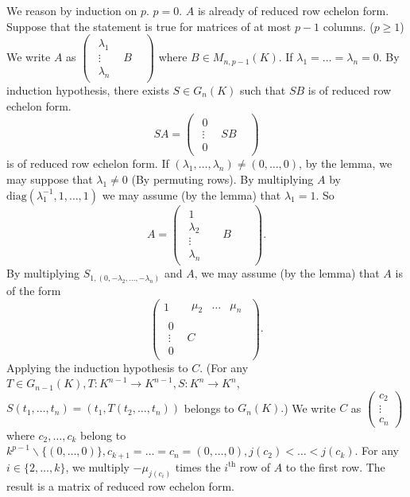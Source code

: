 \begin{proofenv}
    We reason by induction on $p$.
    \newline
    $p=0$. $A$ is already of reduced row echelon form.
    \newline
    Suppose that the statement is true for matrices of at most $p-1$ columns. ($p\ge 1$) We write $A$ as $\begin{pmatrix}
 \begin{matrix}
 \lambda _1\\
 \vdots\\
\lambda _n
\end{matrix} &B&
\end{pmatrix}$ where $B\in M_{n,p-1}(K)$. If $\lambda_1=\dots=\lambda_n=0$. By induction hypothesis, there exists $S\in G_n(K)$ such that $SB$ is of reduced row echelon form.
$$SA= \begin{pmatrix}\begin{matrix}
0\\
 \vdots\\
0
\end{matrix} &SB&
\end{pmatrix}$$
 is of reduced row echelon form. If $(\lambda_1,\dots,\lambda_n)\not=(0,\dots,0)$, by the lemma, we may suppose that $\lambda_1\not=0$ (By permuting rows). By multiplying $A$ by $\mathrm{diag}(\lambda_1^{-1},1,\dots,1)$ we may assume (by the lemma) that $\lambda_1=1$. So 
 $$A= \begin{pmatrix}\begin{matrix}
 1\\
\lambda _2\\
 \vdots\\
\lambda _n
\end{matrix} &&B&&
\end{pmatrix}.$$
By multiplying $S_{1,(0,-\lambda_2,\dots,-\lambda_n)}$ and $A$, we may assume (by the lemma) that $A$ is of the form 
$$\begin{pmatrix}
 1 &\begin{matrix}
  \mu_2& \dots &\mu_n
\end{matrix} \\
 \begin{matrix}
 0\\
 \vdots\\
0
\end{matrix} &C
\end{pmatrix}.$$
Applying the induction hypothesis to $C$.
(For any $T\in G_{n-1}(K), T:K^{n-1}\rightarrow K^{n-1}, S:K^n\rightarrow K^n$, $S(t_1,\dots,t_n)=(t_1,T(t_2,\dots,t_n))$ belongs to $G_n(K).$)
We write $C$ as $\begin{pmatrix}
    c_2\\
    \vdots\\
    c_n
\end{pmatrix}$
where $c_2,\dots,c_k$ belong to $k^{p-1}\backslash\{(0,\dots,0)\},c_{k+1}=\dots=c_n=(0,\dots,0),j(c_2)<\dots<j(c_k)$. For any $i\in \{2,\dots,k\}$, we multiply $-\mu_{j(c_i)}$ times the $i^{\text{th}}$ row of $A$ to the first row. The result is a matrix of reduced row echelon form.
\end{proofenv}


